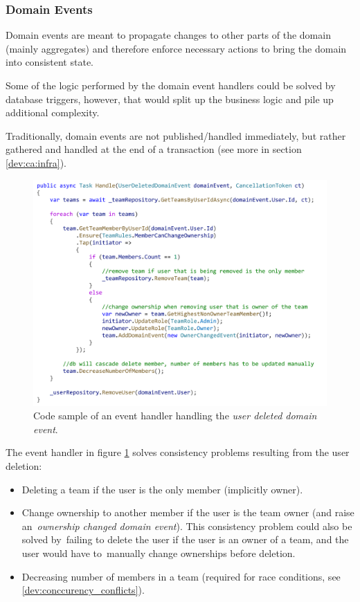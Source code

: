 \subsubsection{Domain Events}
Domain events are meant to propagate changes to other parts of the domain (mainly aggregates) and therefore enforce necessary actions to bring the domain into consistent state.

Some of the logic performed by the domain event handlers could be solved by database triggers, however, that would split up the business logic and pile up additional complexity.

Traditionally, domain events are not published/handled immediately, but rather gathered and handled at the end of a transaction (see more in section \ref{dev:ca:infra}).

\begin{figure} [H]
    \centering
    \includegraphics[width=\textwidth]{figures/doman-event-handler.pdf}
    \caption{Code sample of an event handler handling the \textit{user deleted domain event}.}
    \label{fig:domain_event_handler}
\end{figure}

\vspace{-7pt}
The event handler in figure \ref{fig:domain_event_handler} solves consistency problems resulting from the user deletion:
\begin{itemize}
    \item Deleting a team if the user is the only member (implicitly owner).
    \item Change ownership to another member if the user is the team owner (and raise an~\textit{ownership changed domain event}). This consistency problem could also be solved by~failing to delete the user if the user is an owner of a team, and the user would have to~manually change ownerships before deletion.
    \item Decreasing number of members in a team (required for race conditions, see \ref{dev:conccurency_conflicts}).
\end{itemize}


